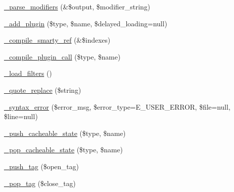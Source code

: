 \begin{DoxyCompactItemize}
\item 
\mbox{\hyperlink{class_smarty___compiler_a5f39bfb73d59e9ec871c9c558c3c5d86}{\+\_\+parse\+\_\+modifiers}} (\&\$output, \$modifier\+\_\+string)
\item 
\mbox{\hyperlink{class_smarty___compiler_a8dc53786beac8f4ca7c8d86cf1bbbd95}{\+\_\+add\+\_\+plugin}} (\$type, \$name, \$delayed\+\_\+loading=null)
\item 
\mbox{\hyperlink{class_smarty___compiler_adc652b9fb4277fd8d33d957608394751}{\+\_\+compile\+\_\+smarty\+\_\+ref}} (\&\$indexes)
\item 
\mbox{\hyperlink{class_smarty___compiler_a302b33495a918bef95258bfb0285a30c}{\+\_\+compile\+\_\+plugin\+\_\+call}} (\$type, \$name)
\item 
\mbox{\hyperlink{class_smarty___compiler_ac3298ba7a8acc1bafeaeae5428c3571e}{\+\_\+load\+\_\+filters}} ()
\item 
\mbox{\hyperlink{class_smarty___compiler_abc08d6f05e29019bfff39a7e9d315feb}{\+\_\+quote\+\_\+replace}} (\$string)
\item 
\mbox{\hyperlink{class_smarty___compiler_a059eb89b6a2caca24b4dca502cb79ed9}{\+\_\+syntax\+\_\+error}} (\$error\+\_\+msg, \$error\+\_\+type=E\+\_\+\+U\+S\+E\+R\+\_\+\+E\+R\+R\+OR, \$file=null, \$line=null)
\item 
\mbox{\hyperlink{class_smarty___compiler_aecdd6b87ba3fdd6efb84b56c5e4dde17}{\+\_\+push\+\_\+cacheable\+\_\+state}} (\$type, \$name)
\item 
\mbox{\hyperlink{class_smarty___compiler_a93a26417dd094b744f7835099e24df0b}{\+\_\+pop\+\_\+cacheable\+\_\+state}} (\$type, \$name)
\item 
\mbox{\hyperlink{class_smarty___compiler_a553d4bd92f21bc3714bf1cadeb61a9d7}{\+\_\+push\+\_\+tag}} (\$open\+\_\+tag)
\item 
\mbox{\hyperlink{class_smarty___compiler_a17a75d1aa9db594013757d6a829436a9}{\+\_\+pop\+\_\+tag}} (\$close\+\_\+tag)
\end{DoxyCompactItemize}
